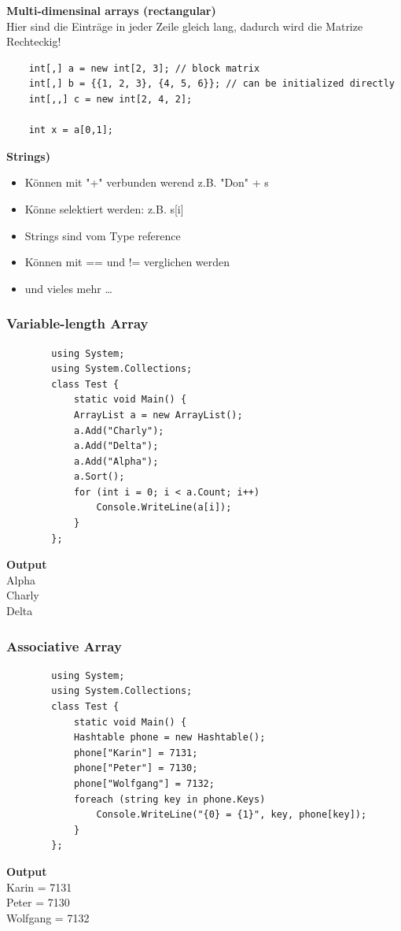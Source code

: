 \textbf{Multi-dimensinal arrays (rectangular)}\\
Hier sind die Einträge in jeder Zeile gleich lang, dadurch wird die Matrize Rechteckig!
\begin{lstlisting}
	int[,] a = new int[2, 3]; // block matrix 
	int[,] b = {{1, 2, 3}, {4, 5, 6}}; // can be initialized directly 
	int[,,] c = new int[2, 4, 2];
	
	int x = a[0,1];
\end{lstlisting}

\textbf{Strings)}\\
\begin{itemize}
	\item Können mit "+" verbunden werend z.B. "Don" + s
	\item Könne selektiert werden: z.B. s[i]
	\item Strings sind vom Type reference
	\item Können mit == und != verglichen werden
	\item und vieles mehr \ldots
\end{itemize}

\subsubsection{Variable-length Array}
\begin{multicols}{2}

	\begin{lstlisting}
		using System;
		using System.Collections;
		class Test {
			static void Main() {
			ArrayList a = new ArrayList();
			a.Add("Charly");
			a.Add("Delta");
			a.Add("Alpha");
			a.Sort();
			for (int i = 0; i < a.Count; i++)
				Console.WriteLine(a[i]);
			}
		};
	\end{lstlisting}
	\columnbreak
	
	\textbf{Output}\\
		Alpha\\
		Charly\\
		Delta\\
\end{multicols}


\subsubsection{Associative Array}
\begin{multicols}{2}

	\begin{lstlisting}
		using System;
		using System.Collections;
		class Test {
			static void Main() {
			Hashtable phone = new Hashtable();
			phone["Karin"] = 7131;
			phone["Peter"] = 7130;
			phone["Wolfgang"] = 7132;
			foreach (string key in phone.Keys)
				Console.WriteLine("{0} = {1}", key, phone[key]);
			}
		};
	\end{lstlisting}
	\columnbreak
	
	\textbf{Output}\\
		Karin = 7131\\
		Peter = 7130\\
		Wolfgang = 7132\\
\end{multicols}



